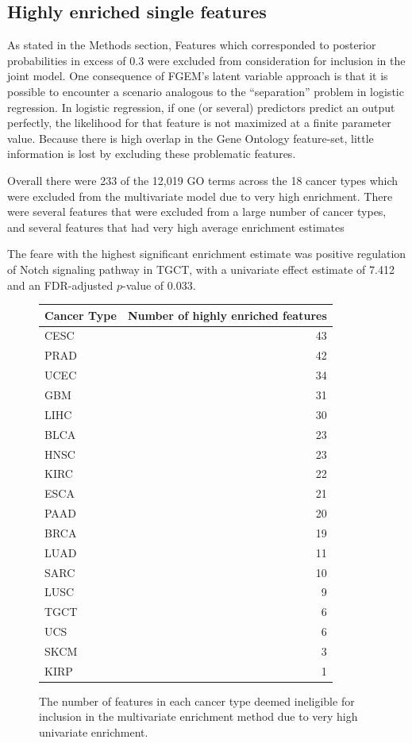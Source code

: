\subsection{Highly enriched single features}
\label{sec:org530c0fc}

As stated in the Methods section, Features which corresponded to posterior probabilities in excess of 0.3 were excluded from consideration for inclusion in the joint model.  One consequence of FGEM's latent variable approach
is that it is possible to encounter a scenario analogous to the ``separation'' problem in logistic regression.  In logistic regression, if one (or several) predictors predict an output perfectly, the likelihood for that 
feature is not maximized at a finite parameter value. Because there is high overlap in the Gene Ontology feature-set, little information is lost by excluding these problematic features.  

Overall there were 233 of the 12,019 GO terms across the 18 cancer types which were excluded from the multivariate model due to very high enrichment.  There were several features that were excluded from a large number of cancer types, and several features that had very high average enrichment estimates

The feare with the highest significant enrichment estimate was positive regulation of Notch signaling pathway in TGCT, with a univariate effect estimate of 7.412 and an FDR-adjusted $p$-value of 0.033.



\begin{figure}
    \centering
\begin{tabular}{l|r}
  \hline
  Cancer Type & Number of highly enriched features\\
  \hline
  CESC & 43\\
  \hline
  PRAD & 42\\
  \hline
  UCEC & 34\\
  \hline
  GBM & 31\\
  \hline
  LIHC & 30\\
  \hline
  BLCA & 23\\
  \hline
  HNSC & 23\\
  \hline
  KIRC & 22\\
  \hline
  ESCA & 21\\
  \hline
  PAAD & 20\\
  \hline
  BRCA & 19\\
  \hline
  LUAD & 11\\
  \hline
  SARC & 10\\
  \hline
  LUSC & 9\\
  \hline
  TGCT & 6\\
  \hline
  UCS & 6\\
  \hline
  SKCM & 3\\
  \hline
  KIRP & 1\\
  \hline
\end{tabular}
    \label{fig:n_enriched}
    \caption{The number of features in each cancer type deemed ineligible for inclusion in the multivariate enrichment method due to very high univariate enrichment.}
\end{figure}


